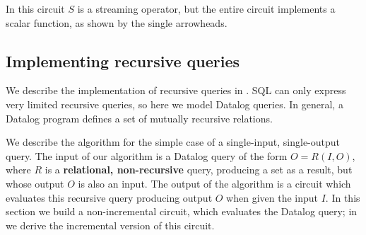 In this circuit $S$ is a streaming operator, but the entire circuit
implements a scalar function, as shown by the single arrowheads.


\subsection{Implementing recursive queries}\label{sec:datalog}

We describe the implementation of recursive queries in \dbsp.  SQL can
only express very limited recursive queries, so here we model Datalog
queries.  In general, a Datalog program defines a set of mutually
recursive relations.

We describe the algorithm for the simple case of a single-input,
single-output query.  The input of our algorithm is a Datalog query of
the form $O = R(I, O)$, where $R$ is a \textbf{relational,
  non-recursive} query, producing a set as a result, but whose output
$O$ is also an input.  The output of the algorithm is a \dbsp circuit
which evaluates this recursive query producing output $O$ when given
the input $I$.  In this section we build a non-incremental circuit,
which evaluates the Datalog query; in  we derive
the incremental version of this circuit.

